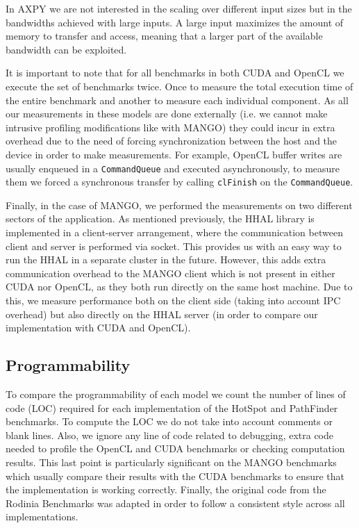 In AXPY we are not interested in the scaling over different input sizes but in the bandwidths achieved with large inputs. A large input maximizes the amount of memory to transfer and access, meaning that a larger part of the available bandwidth can be exploited.  

It is important to note that for all benchmarks in both CUDA and OpenCL we execute the set of benchmarks twice. Once to measure the total execution time of the entire benchmark and another to measure each individual component. As all our measurements in these models are done externally (i.e. we cannot make intrusive profiling modifications like with MANGO) they could incur in extra overhead due to the need of forcing synchronization between the host and the device in order to make measurements. For example, OpenCL buffer writes are usually enqueued in a \texttt{CommandQueue} and executed asynchronously, to measure them we forced a synchronous transfer by calling \texttt{clFinish} on the \texttt{CommandQueue}.

Finally, in the case of MANGO, we performed the measurements on two different sectors of the application. As mentioned previously, the HHAL library is implemented in a client-server arrangement, where the communication between client and server is performed via socket. This provides us with an easy way to run the HHAL in a separate cluster in the future. However, this adds extra communication overhead to the MANGO client which is not present in either CUDA nor OpenCL, as they both run directly on the same host machine. Due to this, we measure performance both on the client side (taking into account IPC overhead) but also directly on the HHAL server (in order to compare our implementation with CUDA and OpenCL).

\subsection{Programmability}

To compare the programmability of each model we count the number of lines of code (LOC) required for each implementation of the HotSpot and PathFinder benchmarks. To compute the LOC we do not take into account comments or blank lines. Also, we ignore any line of code related to debugging, extra code needed to profile the OpenCL and CUDA benchmarks or checking computation results. This last point is particularly significant on the MANGO benchmarks which usually compare their results with the CUDA benchmarks to ensure that the implementation is working correctly. Finally, the original code from the Rodinia Benchmarks was adapted in order to follow a consistent style across all implementations. 

